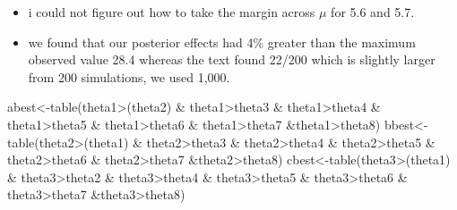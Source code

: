 \documentclass[
]{book}
\newenvironment{Shaded}{\begin{snugshade}}{\end{snugshade}}
\newcommand{\FunctionTok}[1]{\textcolor[rgb]{0.00,0.00,0.00}{#1}}
\newcommand{\NormalTok}[1]{#1}
\newcommand{\OtherTok}[1]{\textcolor[rgb]{0.56,0.35,0.01}{#1}}
\newcommand{\SpecialCharTok}[1]{\textcolor[rgb]{0.00,0.00,0.00}{#1}}
\theoremstyle{definition}
\theoremstyle{definition}
\theoremstyle{definition}
\theoremstyle{definition}
\theoremstyle{remark}
\begin{document}
\begin{itemize}
\item
  i could not figure out how to take the margin across \(\mu\) for 5.6 and 5.7.
\item
  we found that our posterior effects had 4\(\%\) greater than the maximum observed value 28.4 whereas the text found 22/200 which is slightly larger from 200 simulations, we used 1,000.
\end{itemize}

\begin{Shaded}
\begin{Highlighting}[]
\NormalTok{  abest}\OtherTok{\textless{}{-}}\FunctionTok{table}\NormalTok{(theta1}\SpecialCharTok{\textgreater{}}\NormalTok{(theta2) }\SpecialCharTok{\&}\NormalTok{ theta1}\SpecialCharTok{\textgreater{}}\NormalTok{theta3 }\SpecialCharTok{\&}\NormalTok{ theta1}\SpecialCharTok{\textgreater{}}\NormalTok{theta4 }\SpecialCharTok{\&}\NormalTok{ theta1}\SpecialCharTok{\textgreater{}}\NormalTok{theta5 }\SpecialCharTok{\&}\NormalTok{ theta1}\SpecialCharTok{\textgreater{}}\NormalTok{theta6 }\SpecialCharTok{\&}\NormalTok{ theta1}\SpecialCharTok{\textgreater{}}\NormalTok{theta7 }\SpecialCharTok{\&}\NormalTok{theta1}\SpecialCharTok{\textgreater{}}\NormalTok{theta8)}
\NormalTok{  bbest}\OtherTok{\textless{}{-}}\FunctionTok{table}\NormalTok{(theta2}\SpecialCharTok{\textgreater{}}\NormalTok{(theta1) }\SpecialCharTok{\&}\NormalTok{ theta2}\SpecialCharTok{\textgreater{}}\NormalTok{theta3 }\SpecialCharTok{\&}\NormalTok{ theta2}\SpecialCharTok{\textgreater{}}\NormalTok{theta4 }\SpecialCharTok{\&}\NormalTok{ theta2}\SpecialCharTok{\textgreater{}}\NormalTok{theta5 }\SpecialCharTok{\&}\NormalTok{ theta2}\SpecialCharTok{\textgreater{}}\NormalTok{theta6 }\SpecialCharTok{\&}\NormalTok{ theta2}\SpecialCharTok{\textgreater{}}\NormalTok{theta7 }\SpecialCharTok{\&}\NormalTok{theta2}\SpecialCharTok{\textgreater{}}\NormalTok{theta8)}
\NormalTok{  cbest}\OtherTok{\textless{}{-}}\FunctionTok{table}\NormalTok{(theta3}\SpecialCharTok{\textgreater{}}\NormalTok{(theta1) }\SpecialCharTok{\&}\NormalTok{ theta3}\SpecialCharTok{\textgreater{}}\NormalTok{theta2 }\SpecialCharTok{\&}\NormalTok{ theta3}\SpecialCharTok{\textgreater{}}\NormalTok{theta4 }\SpecialCharTok{\&}\NormalTok{ theta3}\SpecialCharTok{\textgreater{}}\NormalTok{theta5 }\SpecialCharTok{\&}\NormalTok{ theta3}\SpecialCharTok{\textgreater{}}\NormalTok{theta6 }\SpecialCharTok{\&}\NormalTok{ theta3}\SpecialCharTok{\textgreater{}}\NormalTok{theta7 }\SpecialCharTok{\&}\NormalTok{theta3}\SpecialCharTok{\textgreater{}}\NormalTok{theta8)}

\end{Highlighting}
\end{Shaded}
\end{document}
